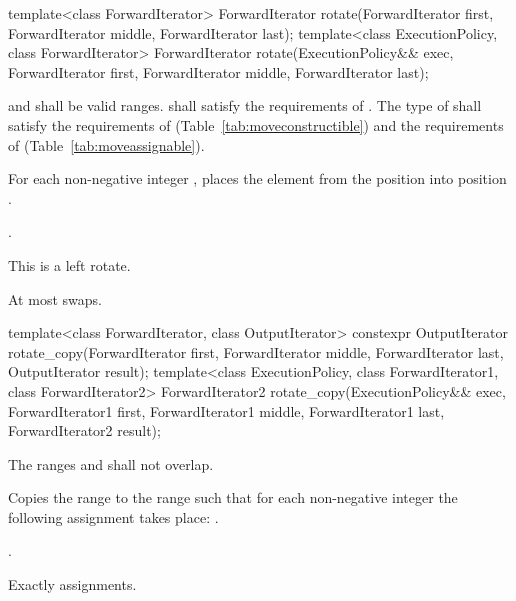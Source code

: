 %
\begin{itemdecl}
template<class ForwardIterator>
  ForwardIterator
    rotate(ForwardIterator first, ForwardIterator middle, ForwardIterator last);
template<class ExecutionPolicy, class ForwardIterator>
  ForwardIterator
    rotate(ExecutionPolicy&& exec,
           ForwardIterator first, ForwardIterator middle, ForwardIterator last);
\end{itemdecl}

\begin{itemdescr}
\pnum
\requires
{}
and
shall be valid ranges.
 shall satisfy the requirements of
. The type of  shall satisfy
the requirements of 
(Table~\ref{tab:moveconstructible}) and the
requirements of
(Table~\ref{tab:moveassignable}).

\pnum
\effects
For each non-negative integer
,
places the element from the position
into position
.

\pnum
\returns {}.

\pnum
\remarks
This is a left rotate.

\pnum
\complexity
At most
swaps.
\end{itemdescr}

%
\begin{itemdecl}
template<class ForwardIterator, class OutputIterator>
  constexpr OutputIterator
    rotate_copy(ForwardIterator first, ForwardIterator middle, ForwardIterator last,
                OutputIterator result);
template<class ExecutionPolicy, class ForwardIterator1, class ForwardIterator2>
  ForwardIterator2
    rotate_copy(ExecutionPolicy&& exec,
                ForwardIterator1 first, ForwardIterator1 middle, ForwardIterator1 last,
                ForwardIterator2 result);
\end{itemdecl}

\begin{itemdescr}
\pnum
\requires
The ranges
and
shall not overlap.

\pnum
\effects
Copies the range
to the range
such that for each non-negative integer
the following assignment takes place:
.

\pnum
\returns
{}.

\pnum
\complexity
Exactly
assignments.
\end{itemdescr}

